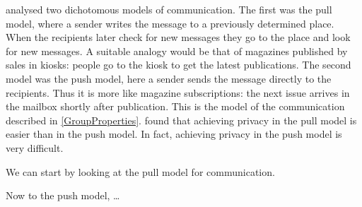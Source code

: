 \citet{PPACforPubFS} analysed two dichotomous models of communication.
The first was the pull model, where a sender writes the message to a previously 
determined place.
When the recipients later check for new messages they go to the place and look 
for new messages.
A suitable analogy would be that of magazines published by sales in kiosks: 
people go to the kiosk to get the latest publications.
The second model was the push model, here a sender sends the message directly 
to the recipients.
Thus it is more like magazine subscriptions: the next issue arrives in the 
mailbox shortly after publication.
This is the model of the communication described in \cref{GroupProperties}.
\citeauthor{PPACforPubFS} found that achieving privacy in the pull model is 
easier than in the push model.
In fact, achieving privacy in the push model is very difficult.

We can start by looking at the pull model for communication.

Now to the push model, \dots
